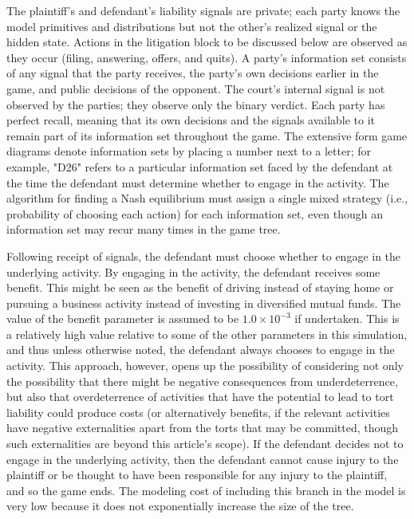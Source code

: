 \documentclass{article}
\begin{document}
The plaintiff’s and defendant’s liability signals are private; each party knows the model primitives and distributions but not the other’s realized signal or the hidden state. Actions in the litigation block to be discussed below are observed as they occur (filing, answering, offers, and quits). A party's information set consists of any signal that the party receives, the party's own decisions earlier in the game, and public decisions of the opponent. The court’s internal signal is not observed by the parties; they observe only the binary verdict. Each party has perfect recall, meaning that its own decisions and the signals available to it remain part of its information set throughout the game. The extensive form game diagrams denote information sets by placing a number next to a letter; for example, "D26" refers to a particular information set faced by the defendant at the time the defendant must determine whether to engage in the activity. The algorithm for finding a Nash equilibrium must assign a single mixed strategy (i.e., probability of choosing each action) for each information set, even though an information set may recur many times in the game tree.

Following receipt of signals, the defendant must choose whether to engage in the underlying activity. By engaging in the activity, the defendant receives some benefit. This might be seen as the benefit of driving instead of staying home or pursuing a business activity instead of investing in diversified mutual funds. The value of the benefit parameter is assumed to be $1.0 \times 10^{-3}$ if undertaken. This is a relatively high value relative to some of the other parameters in this simulation, and thus unless otherwise noted, the defendant always chooses to engage in the activity. This approach, however, opens up the possibility of considering not only the possibility that there might be negative consequences from underdeterrence, but also that overdeterrence of activities that have the potential to lead to tort liability could produce costs (or alternatively benefits, if the relevant activities have negative externalities apart from the torts that may be committed, though such externalities are beyond this article's scope). If the defendant decides not to engage in the underlying activity, then the defendant cannot cause injury to the plaintiff or be thought to have been responsible for any injury to the plaintiff, and so the game ends. The modeling cost of including this branch in the model is very low because it does not exponentially increase the size of the tree.
\end{document}
